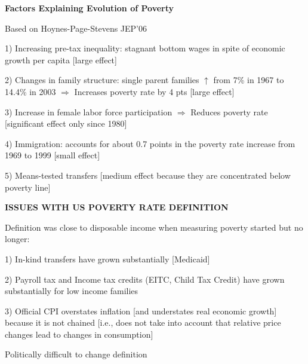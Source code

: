 \documentclass[landscape]{slides}
\begin{document}
%



\begin{slide}

\end{slide}


\begin{slide}
\begin{center}
{\bf Factors Explaining Evolution of Poverty}
\end{center}
Based on Hoynes-Page-Stevens JEP'06

1) Increasing pre-tax inequality: stagnant bottom wages in spite
of economic growth per capita [large effect]

2) Changes in family structure: single parent families $\uparrow$
from 7\% in 1967 to 14.4\% in 2003 $\Rightarrow$ Increases poverty
rate by 4 pts [large effect]

3) Increase in female labor force participation $\Rightarrow$
Reduces poverty rate [significant effect only since 1980]

4) Immigration: accounts for about 0.7 points in the poverty rate
increase from 1969 to 1999 [small effect]

5) Means-tested transfers [medium effect because they are
concentrated below poverty line]
\end{slide}

%

\begin{slide}
\begin{center}
{\bf ISSUES WITH US POVERTY RATE DEFINITION}
\end{center}
Definition was close to disposable income when measuring poverty started but no longer:

1) In-kind transfers have grown substantially [Medicaid]

2) Payroll tax and Income tax credits (EITC, Child Tax Credit)
have grown substantially for low income families

3) Official CPI overstates inflation [and understates real economic growth] because
it is not chained [i.e., does not take into account that relative price changes lead to changes in
consumption]


Politically difficult to change definition
\end{slide}
\end{document}
